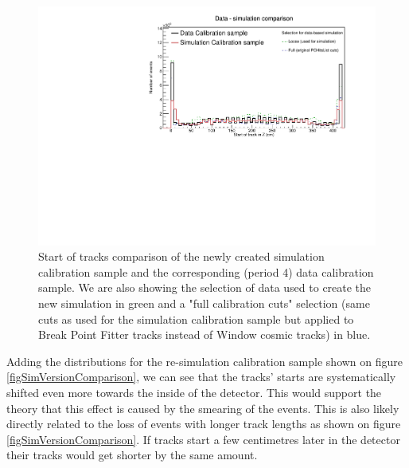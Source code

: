 \documentclass[12pt]{article}
\begin{document}
\begin{figure}[!ht]
\includegraphics[clip, width=\textwidth]{DataMCComparison_StartZ.pdf}
\caption{Start of tracks comparison of the newly created simulation calibration sample and the corresponding (period 4) data calibration sample. We are also showing the selection of data used to create the new simulation in green and a "full calibration cuts" selection (same cuts as used for the simulation calibration sample but applied to Break Point Fitter tracks instead of Window cosmic tracks) in blue.}
\label{figDataMCComparison_startZ}
\end{figure}

Adding the distributions for the re-simulation calibration sample shown on figure \ref{figSimVersionComparison}, we can see that the tracks' starts are systematically shifted even more towards the inside of the detector. This would support the theory that this effect is caused by the smearing of the events. This is also likely directly related to the loss of events with longer track lengths as shown on figure \ref{figSimVersionComparison}. If tracks start a few centimetres later in the detector their tracks would get shorter by the same amount.
\end{document}
